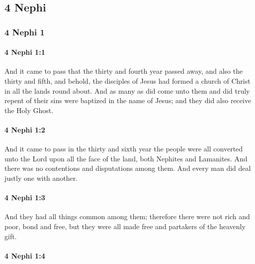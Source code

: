 \subsection{4 Nephi}
	\label{4NEPHI}

	\subsubsection{4 Nephi 1}
		\label{4NEPHI-1}
	
		\paragraph{4 Nephi 1:1} %
			\label{4NEPHI-1-1}

			And it came to pass that the thirty and fourth year passed away,
			and also the thirty and fifth,
			and behold, the disciples of Jesus had formed a church of Christ
			in all the lands round about.
			And as many as did come unto them and did truly repent of their sins
			were baptized in the name of Jesus;
			and they did also receive the Holy Ghost.

		\paragraph{4 Nephi 1:2} %
			\label{4NEPHI-1-2}

			And it came to pass in the thirty and sixth year
			the people were all converted unto the Lord
			upon all the face of the land,
			both Nephites and Lamanites.
			And there was no contentions and disputations among them.
			And every man did deal justly one with another.

		\paragraph{4 Nephi 1:3} %
			\label{4NEPHI-1-3}

			And they had all things common among them;
			therefore there were not rich and poor, bond and free,
			but they were all made free and partakers of the heavenly gift.

		\paragraph{4 Nephi 1:4} %
			\label{4NEPHI-1-4}

